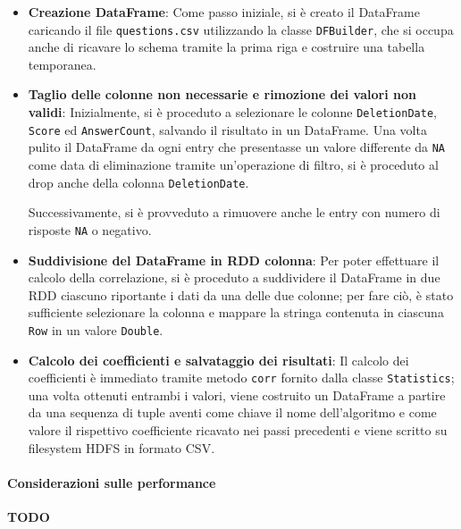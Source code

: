   \begin{itemize}
    \item
      \textbf{Creazione DataFrame}:
      Come passo iniziale, si è creato il DataFrame caricando il file \texttt{questions.csv} utilizzando la
      classe \texttt{DFBuilder}, che si occupa anche di ricavare lo schema tramite la prima riga e costruire una tabella temporanea.

    \item
      \textbf{Taglio delle colonne non necessarie e rimozione dei valori non validi}:
      Inizialmente, si è proceduto a selezionare le colonne \texttt{DeletionDate}, \texttt{Score} ed \texttt{AnswerCount}, salvando il risultato in un DataFrame.
      Una volta pulito il DataFrame da ogni entry che presentasse un valore differente da \texttt{NA} come data di eliminazione tramite un'operazione di filtro,
      si è proceduto al drop anche della colonna \texttt{DeletionDate}.

      Successivamente, si è provveduto a rimuovere anche le entry con numero di risposte \texttt{NA} o negativo.

    \item
      \textbf{Suddivisione del DataFrame in RDD colonna}:
      Per poter effettuare il calcolo della correlazione, si è proceduto a suddividere il DataFrame in due RDD ciascuno riportante i dati da una delle due colonne;
      per fare ciò, è stato sufficiente selezionare la colonna e mappare la stringa contenuta in ciascuna \texttt{Row} in un valore \texttt{Double}.

    \item
      \textbf{Calcolo dei coefficienti e salvataggio dei risultati}:
      Il calcolo dei coefficienti è immediato tramite metodo \texttt{corr} fornito dalla classe \texttt{Statistics};
      una volta ottenuti entrambi i valori, viene costruito un DataFrame a partire da una sequenza di tuple
      aventi come chiave il nome dell'algoritmo e come valore il rispettivo coefficiente ricavato nei passi precedenti
      e viene scritto su filesystem HDFS in formato CSV.
  \end{itemize}

  \paragraph{Considerazioni sulle performance}\label{par:job3:performance}

  \textbf{TODO}
